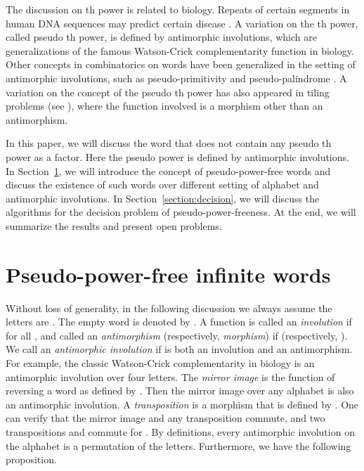 \documentclass[12pt]{article}
\begin{document}
The discussion on th power is related to biology. Repeats of
certain segments in human DNA sequences may predict certain disease
\cite{Mirkin2007}. A variation on the th power, called pseudo
th power, is defined by antimorphic involutions, which are
generalizations of the famous Watson-Crick complementarity function
in biology. Other concepts in combinatorics on words have been
generalized in the setting of antimorphic involutions, such as
pseudo-primitivity \cite{Czeizler&Kari&Seki2009} and
pseudo-palindrome \cite{Kari&Mahalingam2009}. A variation on the
concept of the pseudo th power has also appeared in tiling
problems (see \cite{Beauquier&Nivat1991,Braquelaire&Vialard1999}),
where the function involved is a morphism other than an
antimorphism.


In this paper, we will discuss the word that does not contain any
pseudo th power as a factor. Here the pseudo power is defined by
antimorphic involutions. In Section~\ref{section:freeword}, we will
introduce the concept of pseudo-power-free words and discuss the
existence of such words over different setting of alphabet and
antimorphic involutions. In Section~\ref{section:decision}, we will
discuss the algorithms for the decision problem of
pseudo-power-freeness. At the end, we will summarize the results and
present open problems.



\section{Pseudo-power-free infinite words}\label{section:freeword}
Without loss of generality, in the following discussion we always
assume the letters are . The empty word is
denoted by . A function  is
called an \emph{involution} if  for all
, and called an \emph{antimorphism} (respectively,
\emph{morphism}) if  (respectively,
). We call  an
\emph{antimorphic involution} if  is both an involution and
an antimorphism. For example, the classic Watson-Crick
complementarity in biology is an antimorphic involution over four
letters. The \emph{mirror image} is the function of reversing a word
as defined by . Then the
mirror image over any alphabet is also an antimorphic involution. A
\emph{transposition}  is a morphism that is defined by
. One can verify that the mirror image and any
transposition commute, and two transpositions  and
 commute for . By definitions,
every antimorphic involution on the alphabet is a permutation of the
letters. Furthermore, we have the following proposition.
\end{document}
